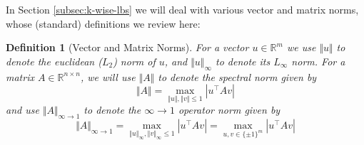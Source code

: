\documentclass[11pt]{article}
\newtheorem{definition}{Definition}
\newcommand{\norm}[1]{\Vert #1 \Vert}
\begin{document}
In Section \ref{subsec:k-wise-lbs} we will deal with various vector and matrix norms, whose (standard) definitions we review here:
\begin{definition}[Vector and Matrix Norms]
For a vector $u \in \mathbb{R}^m$ we use $\norm{u}$ to denote the euclidean ($L_2$) norm of $u$, and $ \norm{u}_\infty$ to denote its $L_{\infty}$ norm. For a matrix $A \in \mathbb{R}^{n \times n}$, we will use $\norm{A}$ to denote the spectral norm given by
\[
\norm{A} = \max\limits_{\norm{u},\norm{v} \leq 1} |u^\top A v|
\]
and use $\norm{A}_{\infty \to 1}$ to denote the $\infty\to1$ operator norm given by
\[
\norm{A}_{\infty\to 1} = \max\limits_{\norm{u}_\infty,\norm{v}_\infty \leq 1}|u^\top A v| =  \max\limits_{u,v \in \{\pm 1\}^m} |u^\top A v|
\]
\end{definition}
\end{document}
